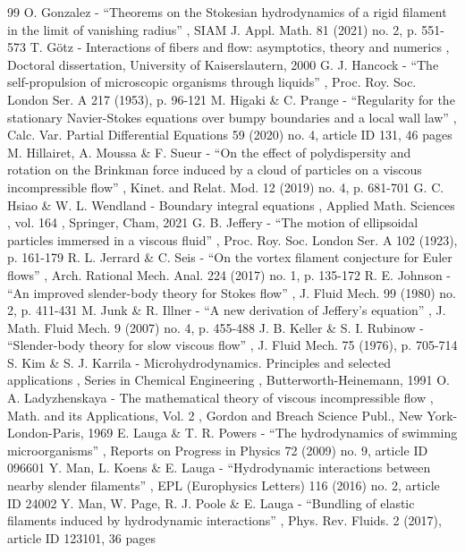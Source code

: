 \documentclass[11pt]{article}
\theoremstyle{definition}
\theoremstyle{remark}
\begin{document}
\begin{thebibliography}{99}
 O. Gonzalez - “Theorems on the Stokesian hydrodynamics of a rigid filament in the limit of vanishing radius” , SIAM J. Appl. Math. 81 (2021) no. 2, p. 551-573
 T. Götz - Interactions of fibers and flow: asymptotics, theory and numerics , Doctoral dissertation, University of Kaiserslautern, 2000
 G. J. Hancock - “The self-propulsion of microscopic organisms through liquids” , Proc. Roy. Soc. London Ser. A 217 (1953), p. 96-121
 M. Higaki \& C. Prange - “Regularity for the stationary Navier-Stokes equations over bumpy boundaries and a local wall law” , Calc. Var. Partial Differential Equations 59 (2020) no. 4, article ID 131, 46 pages
 M. Hillairet, A. Moussa \& F. Sueur - “On the effect of polydispersity and rotation on the Brinkman force induced by a cloud of particles on a viscous incompressible flow” , Kinet. and Relat. Mod. 12 (2019) no. 4, p. 681-701
 G. C. Hsiao \& W. L. Wendland - Boundary integral equations , Applied Math. Sciences , vol. 164 , Springer, Cham, 2021
 G. B. Jeffery - “The motion of ellipsoidal particles immersed in a viscous fluid” , Proc. Roy. Soc. London Ser. A 102 (1923), p. 161-179
 R. L. Jerrard \& C. Seis - “On the vortex filament conjecture for Euler flows” , Arch. Rational Mech. Anal. 224 (2017) no. 1, p. 135-172
 R. E. Johnson - “An improved slender-body theory for Stokes flow” , J. Fluid Mech. 99 (1980) no. 2, p. 411-431
 M. Junk \& R. Illner - “A new derivation of Jeffery’s equation” , J. Math. Fluid Mech. 9 (2007) no. 4, p. 455-488
 J. B. Keller \& S. I. Rubinow - “Slender-body theory for slow viscous flow” , J. Fluid Mech. 75 (1976), p. 705-714
 S. Kim \& S. J. Karrila - Microhydrodynamics. Principles and selected applications , Series in Chemical Engineering , Butterworth-Heinemann, 1991
 O. A. Ladyzhenskaya - The mathematical theory of viscous incompressible flow , Math. and its Applications, Vol. 2 , Gordon and Breach Science Publ., New York-London-Paris, 1969
 E. Lauga \& T. R. Powers - “The hydrodynamics of swimming microorganisms” , Reports on Progress in Physics 72 (2009) no. 9, article ID 096601
 Y. Man, L. Koens \& E. Lauga - “Hydrodynamic interactions between nearby slender filaments” , EPL (Europhysics Letters) 116 (2016) no. 2, article ID 24002
 Y. Man, W. Page, R. J. Poole \& E. Lauga - “Bundling of elastic filaments induced by hydrodynamic interactions” , Phys. Rev. Fluids. 2 (2017), article ID 123101, 36 pages

\end{thebibliography}
\end{document}
